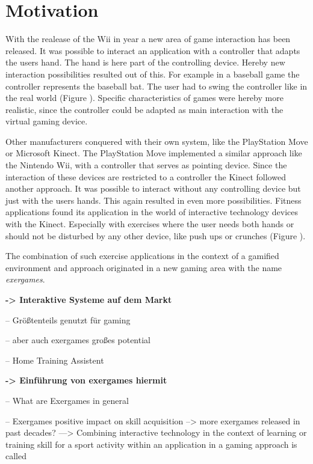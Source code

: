 \section{Motivation}
With the realease of the Wii in year  a new area of game interaction has been released. It was possible to interact an application with a controller that adapts the users hand. The hand is here part of the controlling device. Hereby new interaction possibilities resulted out of this. For example in a baseball game the controller represents the baseball bat. The user had to swing the controller like in the real world (Figure ). Specific characteristics of games were hereby more realistic, since the controller could be adapted as main interaction with the virtual gaming device. 


Other manufacturers conquered with their own system, like the PlayStation Move or Microsoft Kinect. The PlayStation Move implemented a similar approach like the Nintendo Wii, with a controller that serves as pointing device. Since the interaction of these devices are restricted to a controller the Kinect followed another approach. It was possible to interact without any controlling device but just with the users hands. This again resulted in even more possibilities. Fitness applications found its application in the world of interactive technology devices with the Kinect. Especially with exercises where the user needs both hands or should not be disturbed by any other device, like push ups or crunches (Figure ).


The combination of such exercise applications in the context of a gamified environment and approach originated in a new gaming area with the name \textit{exergames}.

\textbf{-> Interaktive Systeme auf dem Markt}

-- Größtenteils genutzt für gaming

-- aber auch exergames großes potential

-- Home Training Assistent

\textbf{-> Einführung von exergames hiermit}

-- What are Exergames in general

-- Exergames positive impact on skill acquisition --> more exergames released in past decades?
---> Combining interactive technology in the context of learning or training skill for a sport activity within an application in a gaming approach is called

